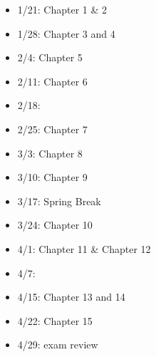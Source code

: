\documentclass[11pt]{article}
\begin{document}
\begin{itemize}
\item 1/21: Chapter 1 \& 2
\item 1/28:  Chapter 3 and 4
\item 2/4: Chapter  5
\item 2/11: Chapter 6
\item 2/18:
\item 2/25: Chapter 7
\item 3/3: Chapter 8
\item 3/10: Chapter 9
\item 3/17: Spring Break
\item 3/24: Chapter 10
\item 4/1:  Chapter 11 \& Chapter 12
\item 4/7:
\item 4/15: Chapter 13 and 14
\item 4/22: Chapter 15
\item 4/29: exam review
\end{itemize}
\end{document}
